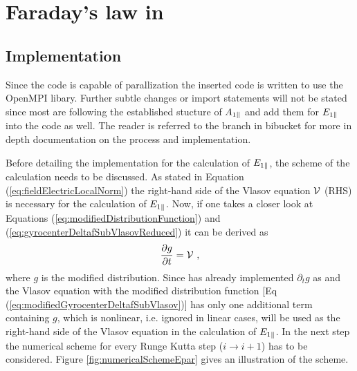 \section{Faraday's law in {\gkw}}
\label{sec:simFieldEpar}

\subsection{Implementation}
\label{sub:implementationFieldEpar}

Since the code is capable of parallization the inserted code is written to use the OpenMPI libary. Further subtle changes or import statements will not be stated since most are following the established stucture of $A_{1\parallel}$ and add them for $E_{1\parallel}$ into the code as well. The reader is referred to the branch in bibucket\cite{FeatureEparBitbucket} for more in depth documentation on the process and implementation.
\bigskip

Before detailing the implementation for the calculation of $E_{1\parallel}$, the scheme of the calculation needs to be discussed. As stated in Equation (\ref{eq:fieldElectricLocalNorm}) the right-hand side of the Vlasov equation $\mathcal{V}$ (RHS) is necessary for the calculation of $E_{1\parallel}$. Now, if one takes a closer look at Equations (\ref{eq:modifiedDistributionFunction}) and (\ref{eq:gyrocenterDeltafSubVlasovReduced}) it can be derived as
\begin{gather}
    \frac{\partial g}{\partial t} = \mathcal{V}~,
    \label{eq:rightHandSide}
\end{gather}
where $g$ is the modified distribution. Since {\gkw} has already implemented $\partial_t g$ as  and the Vlasov equation with the modified distribution function [Eq (\ref{eq:modifiedGyrocenterDeltafSubVlasov})] has only one additional term containing $g$, which is nonlinear, i.e. ignored in linear cases,  will be used as the right-hand side of the Vlasov equation in the calculation of $E_{1\parallel}$. In the next step the numerical scheme for every Runge Kutta step ($i \rightarrow i+1$) has to be considered. Figure \ref{fig:numericalSchemeEpar} gives an illustration of the scheme.


